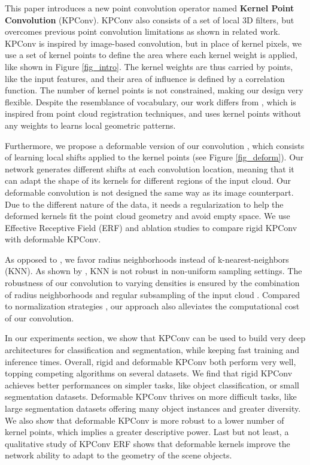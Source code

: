 \documentclass[10pt,twocolumn,letterpaper]{article}
\begin{document}
This paper introduces a new point convolution operator named \textbf{Kernel Point Convolution} (KPConv). KPConv also consists of a set of local 3D filters, but overcomes previous point convolution limitations as shown in related work. KPConv is inspired by image-based convolution, but in place of kernel pixels, we use a set of kernel points to define the area where each kernel weight is applied, like shown in Figure \ref{fig_intro}. The kernel weights are thus carried by points, like the input features, and their area of influence is defined by a correlation function. The number of kernel points is not constrained, making our design very flexible. Despite the resemblance of vocabulary, our work differs from \cite{shen2018mining}, which is inspired from point cloud registration techniques, and uses kernel points without any weights to learns local geometric patterns. 

Furthermore, we propose a deformable version of our convolution \cite{dai2017deformable}, which consists of learning local shifts applied to the kernel points (see Figure \ref{fig_deform}). Our network generates different shifts at each convolution location, meaning that it can adapt the shape of its kernels for different regions of the input cloud. Our deformable convolution is not designed the same way as its image counterpart. Due to the different nature of the data, it needs a regularization to help the deformed kernels fit the point cloud geometry and avoid empty space. We use Effective Receptive Field (ERF) \cite{luo2016understanding} and ablation studies to compare rigid KPConv with deformable KPConv.

As opposed to \cite{wang2018deep, atzmon2018point, xu2018spidercnn, li2018pointcnn}, we favor radius neighborhoods instead of k-nearest-neighbors (KNN). As shown by \cite{hermosilla2018monte}, KNN is not robust in non-uniform sampling settings. The robustness of our convolution to varying densities is ensured by the combination of radius neighborhoods and regular subsampling of the input cloud \cite{thomas2018semantic}. Compared to normalization strategies \cite{hermosilla2018monte, hua2018pointwise}, our approach also alleviates the computational cost of our convolution.

In our experiments section, we show that KPConv can be used to build very deep architectures for classification and segmentation, while keeping fast training and inference times. Overall, rigid and deformable KPConv both perform very well, topping competing algorithms on several datasets. We find that rigid KPConv achieves better performances on simpler tasks, like object classification, or small segmentation datasets. Deformable KPConv thrives on more difficult tasks, like large segmentation datasets offering many object instances and greater diversity. We also show that deformable KPConv is more robust to a lower number of kernel points, which implies a greater descriptive power. Last but not least, a qualitative study of KPConv ERF shows that deformable kernels improve the network ability to adapt to the geometry of the scene objects.
\end{document}
